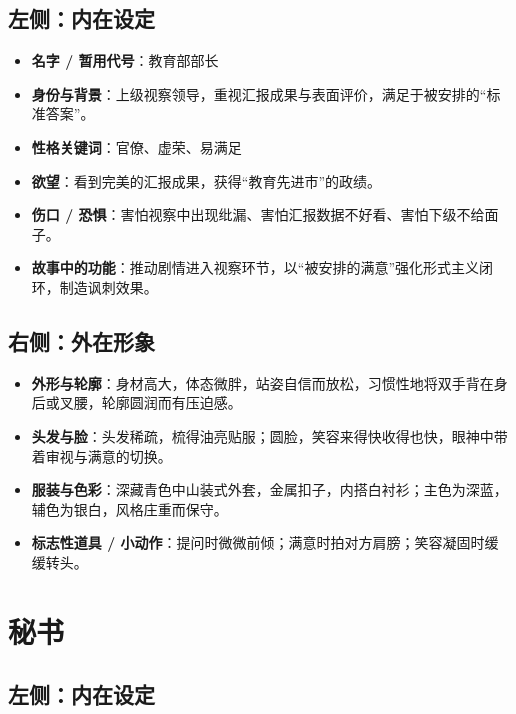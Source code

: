 \documentclass[11pt, a4paper]{article}
\begin{document}
	\subsection*{左侧：内在设定}
	
	\begin{itemize}[leftmargin=2em, itemsep=0.2em]
		\item \textbf{名字 / 暂用代号}：教育部部长
		\item \textbf{身份与背景}：上级视察领导，重视汇报成果与表面评价，满足于被安排的“标准答案”。
		\item \textbf{性格关键词}：官僚、虚荣、易满足
		\item \textbf{欲望}：看到完美的汇报成果，获得“教育先进市”的政绩。
		\item \textbf{伤口 / 恐惧}：害怕视察中出现纰漏、害怕汇报数据不好看、害怕下级不给面子。
		\item \textbf{故事中的功能}：推动剧情进入视察环节，以“被安排的满意”强化形式主义闭环，制造讽刺效果。
	\end{itemize}
	
	\subsection*{右侧：外在形象}
	
	\begin{itemize}[leftmargin=2em, itemsep=0.2em]
		\item \textbf{外形与轮廓}：身材高大，体态微胖，站姿自信而放松，习惯性地将双手背在身后或叉腰，轮廓圆润而有压迫感。
		\item \textbf{头发与脸}：头发稀疏，梳得油亮贴服；圆脸，笑容来得快收得也快，眼神中带着审视与满意的切换。
		\item \textbf{服装与色彩}：深藏青色中山装式外套，金属扣子，内搭白衬衫；主色为深蓝，辅色为银白，风格庄重而保守。
		\item \textbf{标志性道具 / 小动作}：提问时微微前倾；满意时拍对方肩膀；笑容凝固时缓缓转头。
	\end{itemize}
	
	\newpage
	
	\section{秘书}
	
	\subsection*{左侧：内在设定}
	
\end{document}
